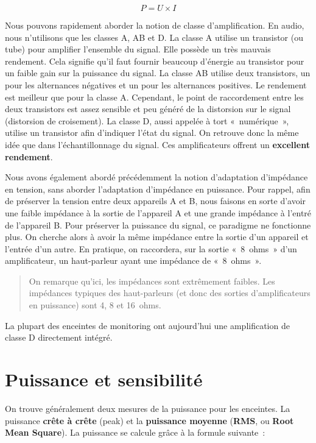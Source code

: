 \documentclass[
  letterpaper,
  DIV=11,
  numbers=noendperiod]{scrreprt}
\begin{document}
\[ P = U \times I \]

Nous pouvons rapidement aborder la notion de classe d'amplification. En
audio, nous n'utilisons que les classes A, AB et D. La classe A utilise
un transistor (ou tube) pour amplifier l'ensemble du signal. Elle
possède un très mauvais rendement. Cela signifie qu'il faut fournir
beaucoup d'énergie au transistor pour un faible gain sur la puissance du
signal. La classe AB utilise deux transistors, un pour les alternances
négatives et un pour les alternances positives. Le rendement est
meilleur que pour la classe A. Cependant, le point de raccordement entre
les deux transistors est assez sensible et peu généré de la distorsion
sur le signal (distorsion de croisement). La classe D, aussi appelée à
tort «~numérique~», utilise un transistor afin d'indiquer l'état du
signal. On retrouve donc la même idée que dans l'échantillonnage du
signal. Ces amplificateurs offrent un \textbf{excellent rendement}.

Nous avons également abordé précédemment la notion d'adaptation
d'impédance en tension, sans aborder l'adaptation d'impédance en
puissance. Pour rappel, afin de préserver la tension entre deux
appareils A et B, nous faisons en sorte d'avoir une faible impédance à
la sortie de l'appareil A et une grande impédance à l'entré de
l'appareil B. Pour préserver la puissance du signal, ce paradigme ne
fonctionne plus. On cherche alors à avoir la même impédance entre la
sortie d'un appareil et l'entrée d'un autre. En pratique, on raccordera,
sur la sortie «~8~ohms~» d'un amplificateur, un haut-parleur ayant une
impédance de «~8~ohms~».

\begin{quote}
On remarque qu'ici, les impédances sont extrêmement faibles. Les
impédances typiques des haut-parleurs (et donc des sorties
d'amplificateurs en puissance) sont 4, 8 et 16~ohms.
\end{quote}

La plupart des enceintes de monitoring ont aujourd'hui une amplification
de classe D directement intégré.

\hypertarget{puissance-et-sensibilituxe9}{%
\section{Puissance et sensibilité}\label{puissance-et-sensibilituxe9}}

On trouve généralement deux mesures de la puissance pour les enceintes.
La puissance \textbf{crête à crête} (peak) et la \textbf{puissance
moyenne} (\textbf{RMS}, ou \textbf{Root Mean Square}). La puissance se
calcule grâce à la formule suivante~:
\end{document}
